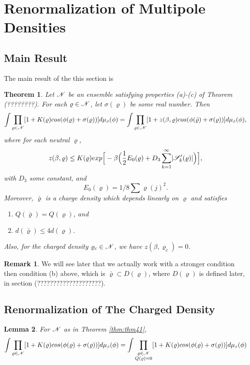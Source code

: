 \documentclass[11pt,reqno]{article}
\DeclarePairedDelimiter\abs{\lvert}{\rvert}%
\newtheorem{thm}{Theorem}[section]
\newtheorem{lemma}[thm]{Lemma}
\theoremstyle{definition}
\newtheorem*{remark}{Remark}
\numberwithin{equation}{section}
\begin{document}
\section{Renormalization of Multipole Densities}\label{sec:chap4}



\subsection{Main Result}
The main result of the this section is
\begin{thm} \label{thm:thm41}
Let $\mathscr{N}$ be an ensemble satisfying properties (a)-(c) of Theorem (????????). For each $\varrho \in \mathscr{N}$, let $\sigma(\varrho)$ be some real number. Then
\begin{equation}
\int\prod_{\varrho \in \mathscr{N}}[1 + K(\varrho)cos(\phi(\varrho) + \sigma(\varrho))]d\mu_{\text{\tiny$\beta$}}(\phi) = 
\int\prod_{\varrho \in \mathscr{N}}[1 + z(\beta,\varrho)cos(\phi(\bar{\varrho}) + \sigma(\varrho))]d\mu_{\text{\tiny$\beta$}}(\phi), 
\end{equation}
where for each neutral $\varrho$,
\begin{equation} \label{eqEloc}
z(\beta,\varrho) \leq K(\varrho)exp\Big[-\beta \Big(\frac{1}{2}E_0(\varrho) + D_3\sum_{k=1}^\infty \abs{\SqrsSetTagOf{k}{\varrho}}\Big)\Big],
\end{equation}
with $D_3$ some constant, and 
\begin{equation} \label{eqE0}
E_0(\varrho) = 1/8\sum\varrho(j)^2. 
\end{equation}
Moreover, $\bar{\varrho}$ is a charge density which depends linearly on $\varrho$ and satisfies
\begin{enumerate}[label={\alph*)}]
\item $Q(\bar{\varrho}) = Q(\varrho)$, and
\item $d(\bar{\varrho}) \leq 4d(\varrho)$.
\end{enumerate}
Also, for the charged density $\varrho_c \in \mathscr{N}$, we have $z(\beta, \varrho_c)=0$.
\end{thm}
\begin{remark}
We will see later that we actually work with a stronger condition then condition (b) above,  which is $\bar{\varrho} \subset D(\varrho)$, where $D(\varrho)$ is defined later, in section (????????????????????).
\end{remark}


\subsection{Renormalization of The Charged Density}
\begin{lemma}
For $\mathscr{N}$ as in Theorem \eqref{thm:thm41}, 
\begin{equation}
\int\prod_{\varrho \in \mathscr{N}}[1 + K(\varrho)cos(\phi(\varrho) + \sigma(\varrho))]d\mu_{\text{\tiny$\beta$}}(\phi) = 
\int\prod_{\substack{\varrho \in \mathscr{N} \\ Q(\varrho) = 0}}[1 + K(\varrho)cos(\phi(\varrho) + \sigma(\varrho))]d\mu_{\text{\tiny$\beta$}}(\phi)
\end{equation}
\end{lemma}
\end{document}
